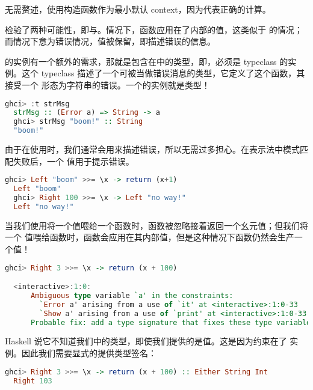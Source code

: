 \documentclass[./main.tex]{subfiles}
\begin{document}
无需赘述，使用构造函数作为最小默认 context，因为代表正确的计算。

\acode{>>=}检验了两种可能性，即与。情况下，函数应用在了内部的值，这类似于
的情况；而情况下意为错误情况，值被保留，即描述错误的信息。

的实例有一个额外的需求，那就是包含在中的类型，即，必须是
typeclass 的实例。这个 typeclass 描述了一个可被当做错误消息的类型，它定义了这个函数，其接受一个
形态为字符串的错误。一个的实例就是类型！

\begin{lstlisting}[language=Haskell]
  ghci> :t strMsg
  strMsg :: (Error a) => String -> a
  ghci> strMsg "boom!" :: String
  "boom!"
\end{lstlisting}

由于在使用时，我们通常会用来描述错误，所以无需过多担心。在表示法中模式匹配失败后，一个
值用于提示错误。

\begin{lstlisting}[language=Haskell]
  ghci> Left "boom" >>= \x -> return (x+1)
  Left "boom"
  ghci> Right 100 >>= \x -> Left "no way!"
  Left "no way!"
\end{lstlisting}

当我们使用\acode{>>=}将一个值喂给一个函数时，函数被忽略接着返回一个幺元值；但我们将一个
值喂给函数时，函数会应用在其内部值，但是这种情况下函数仍然会生产一个值！

\begin{lstlisting}[language=Haskell]
  ghci> Right 3 >>= \x -> return (x + 100)

  <interactive>:1:0:
      Ambiguous type variable `a' in the constraints:
        `Error a' arising from a use of `it' at <interactive>:1:0-33
        `Show a' arising from a use of `print' at <interactive>:1:0-33
      Probable fix: add a type signature that fixes these type variable(s)
\end{lstlisting}

Haskell 说它不知道我们中的类型，即使我们提供的是值。这是因为约束在了
实例。因此我们需要显式的提供类型签名：

\begin{lstlisting}[language=Haskell]
  ghci> Right 3 >>= \x -> return (x + 100) :: Either String Int
  Right 103
\end{lstlisting}
\end{document}
